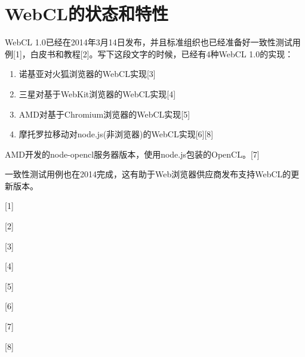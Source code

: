\section{WebCL的状态和特性}

WebCL 1.0已经在2014年3月14日发布，并且标准组织也已经准备好一致性测试用例[1]，白皮书和教程[2]。写下这段文字的时候，已经有4种WebCL 1.0的实现：

\begin{enumerate}
\item 诺基亚对火狐浏览器的WebCL实现[3]
\item 三星对基于WebKit浏览器的WebCL实现[4]
\item AMD对基于Chromium浏览器的WebCL实现[5]
\item 摩托罗拉移动对node.js(非浏览器)的WebCL实现[6][8]
\end{enumerate}

AMD开发的node-opencl服务器版本，使用node.js包装的OpenCL。[7]

一致性测试用例也在2014完成，这有助于Web浏览器供应商发布支持WebCL的更新版本。

\myRefRule

\begin{myRefs}

[1] 

[2] 

[3] 

[4] 

[5] 

[6] 

[7] 

[8] 

\end{myRefs}


